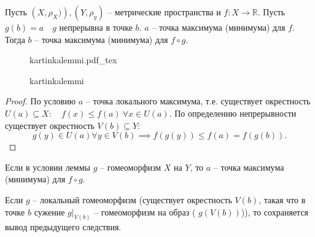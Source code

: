 \documentclass{book}
\newcommand\R{\ensuremath{\mathbb{R}}}
\theoremstyle{definition}
\newcommand{\incfig}[1]{%
    \def\svgwidth{\columnwidth}
    {#1.pdf_tex}
}
\begin{document}
        \begin{lemma}
            Пусть $\left( X, \rho_X) \right) , \left( Y, \rho_y \right) $ -- метрические пространства и $f:X \to \R$.
            Пусть $g(b) = a\quad g$ непрерывна в точке  $b$.  $a $ -- точка максимума (минимума) для  $f$.
            Тогда  $b$ -- точка максимума (минимума) для  $f \circ g$.

        \end{lemma}
\begin{figure}[!ht]
    \centering
    \incfig{kartinkalemmi}
    \caption{kartinkalemmi}
    \label{fig:kartinkalemmi}
\end{figure}
        \begin{proof}
            По условию $a$ -- точка локального максимума, т.е.  существует окрестность $U(a)\subseteq X:\quad f(x)\leqslant f(a)\ \forall x\in U(a)$.
            По определению непрерывности существует окрестность $V(b)\subseteq Y:$
            \[g(y)\in U(a)\forall y\in V(b)\implies f(g(y))\leqslant f(a) = f(g(b)).\]
        \end{proof}

        \begin{corollary}
            Если в условии леммы $g$ -- гомеоморфизм  $X$ на  $Y$, то  $a$ -- точка максимума (минимума) для $f\circ g$.
        \end{corollary}
        \begin{corollary}
            Если $g$ -- локальный гомеоморфизм (существует окрестность $V(b)$, такая что в точке $b$ сужение  $g|_{V(b)}$ -- гомеоморфизм на образ ( $g(V(b))$)), то сохраняется вывод предыдущего следствия. 
        \end{corollary}
\end{document}
